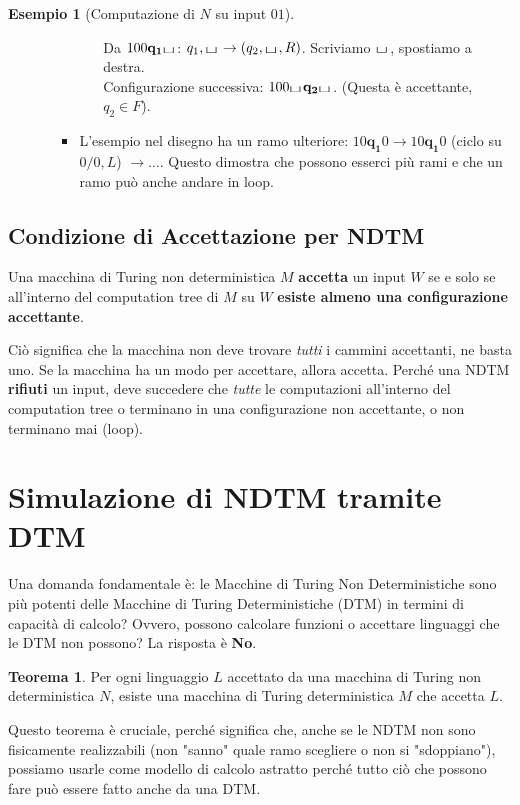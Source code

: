 \documentclass[a4paper]{article}
\theoremstyle{definition} %
\newtheorem{theorem}{Teorema}
\newtheorem{example}{Esempio}
\newcommand{\blankS}{\ensuremath{\raisebox{-0.15ex}{\scalebox{1.3}[0.7]{$\sqcup$}}\mkern2mu}}
\begin{document}
\begin{example}[Computazione di $N$ su input $01$]
\begin{enumerate}
\begin{itemize}
\begin{itemize}
\begin{itemize}
                Da $100\mathbf{q_1}\blankS$: $q_1,\blankS \to (q_2,\blankS,R)$. Scriviamo $\blankS$, spostiamo a destra.\\
                Configurazione successiva: $100\blankS\mathbf{q_2}\blankS$. (Questa è accettante, $q_2 \in F$).
            \end{itemize}
            \item L'esempio nel disegno ha un ramo ulteriore: $10\mathbf{q_1}0 \to 10\mathbf{q_1}0$ (ciclo su $0/0,L$) $\to \dots$. Questo dimostra che possono esserci più rami e che un ramo può anche andare in loop.
        \end{itemize}
    \end{itemize}

\end{enumerate}
\end{example}

\subsection{Condizione di Accettazione per NDTM}

Una macchina di Turing non deterministica $M$ \textbf{accetta} un input $W$ se e solo se all'interno del computation tree di $M$ su $W$ \textbf{esiste almeno una configurazione accettante}.

Ciò significa che la macchina non deve trovare \emph{tutti} i cammini accettanti, ne basta uno. Se la macchina ha un modo per accettare, allora accetta.
Perché una NDTM \textbf{rifiuti} un input, deve succedere che \emph{tutte} le computazioni all'interno del computation tree o terminano in una configurazione non accettante, o non terminano mai (loop).

\section{Simulazione di NDTM tramite DTM}

Una domanda fondamentale è: le Macchine di Turing Non Deterministiche sono più potenti delle Macchine di Turing Deterministiche (DTM) in termini di capacità di calcolo? Ovvero, possono calcolare funzioni o accettare linguaggi che le DTM non possono? La risposta è \textbf{No}.

\begin{theorem}
Per ogni linguaggio $L$ accettato da una macchina di Turing non deterministica $N$, esiste una macchina di Turing deterministica $M$ che accetta $L$.
\end{theorem}
Questo teorema è cruciale, perché significa che, anche se le NDTM non sono fisicamente realizzabili (non "sanno" quale ramo scegliere o non si "sdoppiano"), possiamo usarle come modello di calcolo astratto perché tutto ciò che possono fare può essere fatto anche da una DTM.
\end{document}
